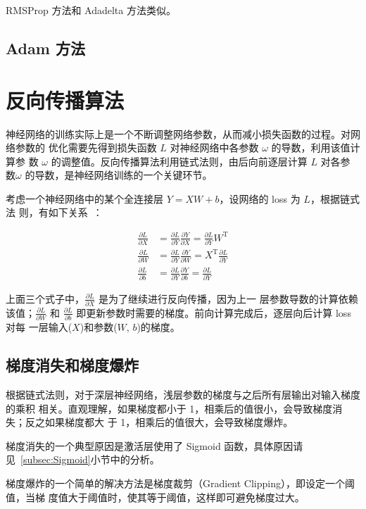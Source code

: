 RMSProp 方法和 Adadelta 方法类似。

\subsection{Adam 方法}


\section{反向传播算法}
神经网络的训练实际上是一个不断调整网络参数，从而减小损失函数的过程。对网络参数的
优化需要先得到损失函数 $L$ 对神经网络中各参数 $\omega$ 的导数，利用该值计算参
数 $\omega$ 的调整值。反向传播算法利用链式法则，由后向前逐层计算 $L$ 对各参
数$\omega$ 的导数，是神经网络训练的一个关键环节。

考虑一个神经网络中的某个全连接层 $Y = XW + b$，设网络的 loss 为 $L$，根据链式法
则，有如下关系~：

\begin{align}
  \label{equ:bp-fc}
  \frac{\partial L}{\partial X} & = \frac{\partial L}{\partial Y} \frac{\partial Y}{\partial X} = \frac{\partial L}{\partial Y} W^{\mathrm{T}} \\
  \frac{\partial L}{\partial W} & = \frac{\partial L}{\partial Y} \frac{\partial Y}{\partial W} = X^{\mathrm{T}} \frac{\partial L}{\partial Y}\\
  \frac{\partial L}{\partial b} & = \frac{\partial L}{\partial Y} \frac{\partial Y}{\partial b} = \frac{\partial L}{\partial Y}
\end{align}

上面三个式子中，$\frac{\partial L}{\partial X}$ 是为了继续进行反向传播，因为上一
层参数导数的计算依赖该值；$\frac{\partial L}{\partial W}$ 和 $\frac{\partial
  L}{\partial b}$ 即更新参数时需要的梯度。前向计算完成后，逐层向后计算 loss 对每
一层输入($X$)和参数($W, \, b$)的梯度。

\subsection{梯度消失和梯度爆炸}
\label{subsec:gradient-vanish-explosion}
根据链式法则，对于深层神经网络，浅层参数的梯度与之后所有层输出对输入梯度的乘积
相关。直观理解，如果梯度都小于 1，相乘后的值很小，会导致梯度消失；反之如果梯度都大
于 1，相乘后的值很大，会导致梯度爆炸。

梯度消失的一个典型原因是激活层使用了 Sigmoid 函数，具体原因请
见~\ref{subsec:Sigmoid}小节中的分析。

梯度爆炸的一个简单的解决方法是梯度裁剪（Gradient Clipping），即设定一个阈值，当梯
度值大于阈值时，使其等于阈值，这样即可避免梯度过大。

